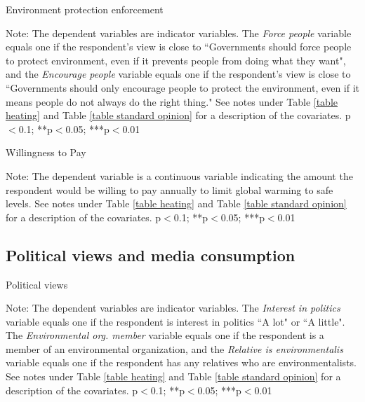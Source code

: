 \documentclass{article}
\begin{document}
\begin{table}[h!]
	\caption{Environment protection enforcement}
	\begin{center}
		\scalebox{0.7}{}
	\end{center}
	{\footnotesize Note: The dependent variables are indicator variables. The \textit{Force people} variable equals one if the respondent's view is close to ``Governments should force people to protect environment, even if it prevents people from doing what they want", and the \textit{Encourage people} variable equals one if the respondent's view is close to ``Governments should only encourage people to protect the environment, even if it means people do not always do the right thing." See notes under Table \ref{table heating} and Table \ref{table standard opinion} for a description of the covariates.
	\newline *p$<$0.1; **p$<$0.05; ***p$<$0.01}
\end{table}	

\begin{table}[h!]
	\caption{Willingness to Pay}
	\begin{center}
		\scalebox{0.7}{}
	\end{center}
	{\footnotesize Note: The dependent variable is a continuous variable indicating the amount the respondent would be willing to pay annually to limit global warming to safe levels. See notes under Table \ref{table heating} and Table \ref{table standard opinion} for a description of the covariates.
	\newline *p$<$0.1; **p$<$0.05; ***p$<$0.01}
\end{table}	

\clearpage
\subsection{Political views and media consumption}

\begin{table}[h!]
	\caption{Political views}
	\begin{center}
		\scalebox{0.7}{}
	\end{center}
	{\footnotesize Note: The dependent variables are indicator variables. The \textit{Interest in politics} variable equals one if the respondent is interest in politics ``A lot" or ``A little". The \textit{Environmental org. member} variable equals one if the respondent is a member of an environmental organization, and the \textit{Relative is environmentalis} variable equals one if the respondent has any relatives who are environmentalists. See notes under Table \ref{table heating} and Table \ref{table standard opinion} for a description of the covariates.
	\newline *p$<$0.1; **p$<$0.05; ***p$<$0.01}
\end{table}	
\end{document}

